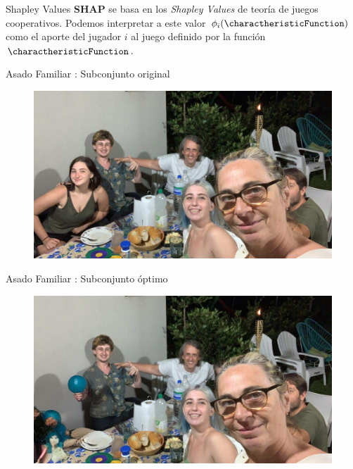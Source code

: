 \begin{frame}{Shapley Values}
    \textbf{SHAP} se basa en los \textit{Shapley Values} de teoría de juegos cooperativos. Podemos interpretar a este valor $\phi_i(\charactheristicFunction)$ como el aporte del jugador $i$ al juego definido por la función $\charactheristicFunction$.
\end{frame}

\begin{frame}{Asado Familiar : Subconjunto original}
		\begin{figure}
		\centering
		\includegraphics[width=0.9\linewidth]{pic/img/XAI/subconjuntoTotal.jpg}
	\end{figure}
\end{frame}

\begin{frame}{Asado Familiar : Subconjunto óptimo}
	\begin{figure}
		\centering
		\includegraphics[width=0.9\linewidth]{pic/img/XAI/subconjuntoOptimo.png}
	\end{figure}
\end{frame}


